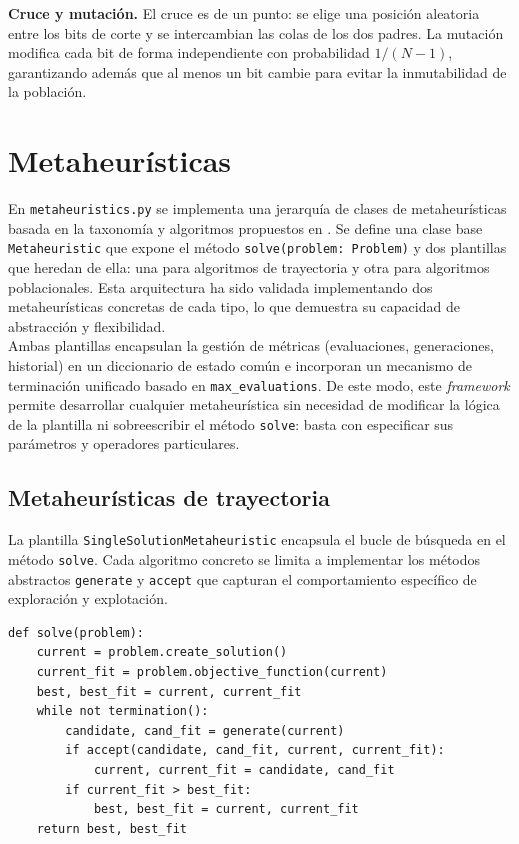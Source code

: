 \documentclass[letterpaper, 12pt]{report}
\begin{document}
\textbf{Cruce y mutación.}
El cruce es de un punto: se elige una posición aleatoria entre los bits de corte y se intercambian las colas de los dos padres.
La mutación modifica cada bit de forma independiente con probabilidad \(1/(N-1)\), garantizando además que al menos un bit cambie para evitar la inmutabilidad de la población.
\section{Metaheurísticas}

En \texttt{metaheuristics.py} se implementa una jerarquía de clases de metaheurísticas basada en la taxonomía y algoritmos propuestos 
en \cite{talbi2009metaheuristics}. 
Se define una clase base \texttt{Metaheuristic} que expone el método \texttt{solve(problem: Problem)} y dos plantillas que heredan de ella: una para algoritmos de trayectoria y otra para algoritmos poblacionales. 
Esta arquitectura ha sido validada implementando dos metaheurísticas concretas de cada tipo, lo que demuestra su capacidad de abstracción y flexibilidad. \\

Ambas plantillas encapsulan la gestión de métricas (evaluaciones, generaciones, historial) en un diccionario de estado común e incorporan un mecanismo de terminación unificado basado en \texttt{max\_evaluations}. 
De este modo, este \textit{framework} permite desarrollar cualquier metaheurística sin necesidad de modificar la lógica de la plantilla ni sobreescribir el método \texttt{solve}: basta con especificar sus parámetros y operadores particulares.

\subsection{Metaheurísticas de trayectoria}

La plantilla \texttt{SingleSolutionMetaheuristic} encapsula el bucle de búsqueda en el método \texttt{solve}. Cada algoritmo concreto se limita a implementar los métodos abstractos \texttt{generate} y \texttt{accept} que capturan el comportamiento específico de exploración y explotación.

\begin{verbatim}
def solve(problem):
    current = problem.create_solution()
    current_fit = problem.objective_function(current)
    best, best_fit = current, current_fit
    while not termination():
        candidate, cand_fit = generate(current)
        if accept(candidate, cand_fit, current, current_fit):
            current, current_fit = candidate, cand_fit
        if current_fit > best_fit:
            best, best_fit = current, current_fit
    return best, best_fit
\end{verbatim}
\end{document}
